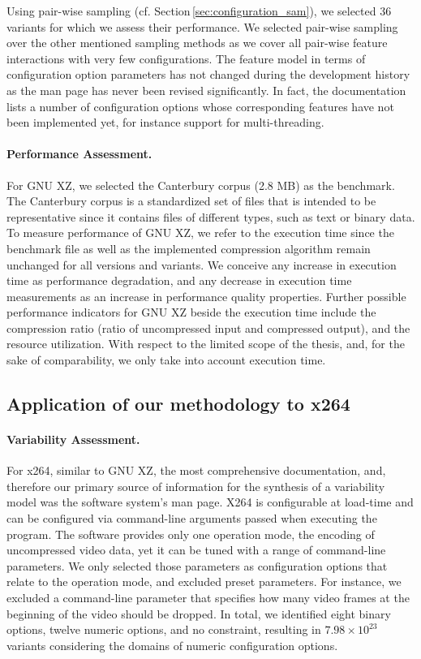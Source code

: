 Using pair-wise sampling (cf. Section\,\ref{sec:configuration_sam}), we selected
36 variants for which we assess their performance. We selected pair-wise sampling over the other
mentioned sampling methods as we cover all pair-wise feature interactions with
very few configurations. The feature model in terms of configuration option
parameters has not changed during the development history as the man page has
never been revised significantly. In fact, the documentation lists a number of
configuration options whose corresponding features have not been implemented
yet, for instance support for multi-threading.

\paragraph{Performance Assessment.} For GNU XZ, we selected the Canterbury
corpus (2.8 MB) as the benchmark. The Canterbury corpus is a standardized set of files that is
intended to be representative since it contains files of different types, such
as text or binary data. To measure performance of GNU XZ, we refer to the
execution time since the benchmark file as well as the implemented compression
algorithm remain unchanged for all versions and variants. We conceive any
increase in execution time as performance degradation, and any decrease in
execution time measurements as an increase in performance quality properties.
Further possible performance indicators for GNU XZ beside the execution time
include the compression ratio (ratio of uncompressed input and compressed
output), and the resource utilization. With respect to the limited scope of the
thesis, and, for the sake of comparability, we only take into account execution
time.

\subsection{Application of our methodology to x264}
\paragraph{Variability Assessment.} For x264, similar to GNU XZ, the most
comprehensive documentation, and, therefore our primary source of information for the
synthesis of a variability model was the software system’s man page. X264 is
configurable at load-time and can be configured via command-line arguments
passed when executing the program. The software provides only one operation
mode, the encoding of uncompressed video data, yet it can be tuned with a range
of command-line parameters. We only selected those parameters as configuration
options that relate to the operation mode, and excluded preset parameters. For
instance, we excluded a command-line parameter that specifies how many video
frames at the beginning of the video should be dropped. In total, we identified
eight binary options, twelve numeric options, and no constraint, resulting in
$7.98 \times 10^{23}$ variants considering the domains of numeric configuration
options.

